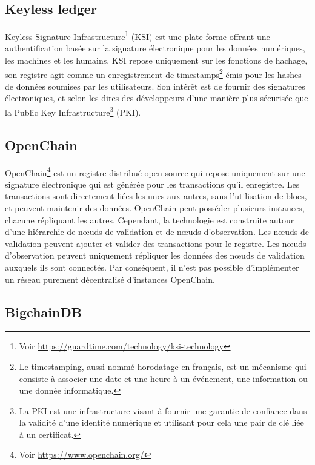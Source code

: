\documentclass{tnreport}
\begin{document}
\subsection{Keyless ledger}

Keyless Signature Infrastructure\footnote{Voir \url{https://guardtime.com/technology/ksi-technology}} (KSI) est une plate-forme offrant une authentification basée sur la signature électronique pour les données numériques, les machines et les humains. KSI repose uniquement sur les fonctions de hachage, son registre agit comme un enregistrement de timestamps\footnote{Le timestamping, aussi nommé horodatage en français, est un mécanisme qui consiste à associer une date et une heure à un événement, une information ou une donnée informatique.} émis pour les hashes de données soumises par les utilisateurs. Son intérêt est de fournir des signatures électroniques, et selon les dires des développeurs d'une manière plus sécurisée que la Public Key Infrastructure\footnote{La PKI est une infrastructure visant à fournir une garantie de confiance dans la validité d’une identité numérique et utilisant pour cela une pair de clé liée à un certificat.} (PKI).

\subsection{OpenChain}

OpenChain\footnote{Voir \url{https://www.openchain.org/}} est un registre distribué open-source qui repose uniquement sur une signature électronique qui est générée pour les transactions qu'il enregistre. Les transactions sont directement liées les unes aux autres, sans l'utilisation de blocs, et peuvent maintenir des données. OpenChain peut posséder plusieurs instances, chacune répliquant les autres. Cependant, la technologie est construite autour d'une hiérarchie de nœuds de validation et de nœuds d'observation. Les nœuds de validation peuvent ajouter et valider des transactions pour le registre. Les nœuds d'observation peuvent uniquement répliquer les données des nœuds de validation auxquels ils sont connectés. Par conséquent, il n'est pas possible d'implémenter un réseau purement décentralisé d'instances OpenChain.

\subsection{BigchainDB}
\end{document}
